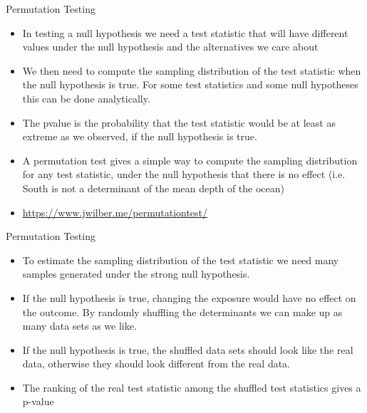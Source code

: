 \documentclass[10pt]{beamer}\usepackage[]{graphicx}\usepackage[]{color}
\begin{document}
\begin{frame}{Permutation Testing}
	\begin{itemize}
		\item In testing a null hypothesis we need a test statistic that will have different values under the null hypothesis and the alternatives we	care about 
		\item We then need to compute the sampling distribution of the test	statistic when the null hypothesis is true. For some test statistics	and some null hypotheses this can be done analytically. 
		\item The pvalue is the probability that the test statistic would be at	least as extreme as we observed, if the null hypothesis is true.
		\item A permutation test gives a simple way to compute the sampling	distribution for any test statistic, under the null hypothesis that there is no effect (i.e. South is not a determinant of the mean depth of the ocean)
		\item \url{https://www.jwilber.me/permutationtest/}
	\end{itemize}
\end{frame}


\begin{frame}{Permutation Testing}
	\begin{itemize}
		\item To estimate the sampling distribution of the test statistic we
		need many samples generated under the strong null hypothesis.
		\item If the null hypothesis is true, changing the exposure would have
		no effect on the outcome. By randomly shuffling the determinants
		we can make up as many data sets as we like.
		\item If the null hypothesis is true, the shuffled data sets should look
		like the real data, otherwise they should look different from the real data.
		\item The ranking of the real test statistic among the shuffled test
		statistics gives a p-value
	\end{itemize}
\end{frame}
\end{document}
